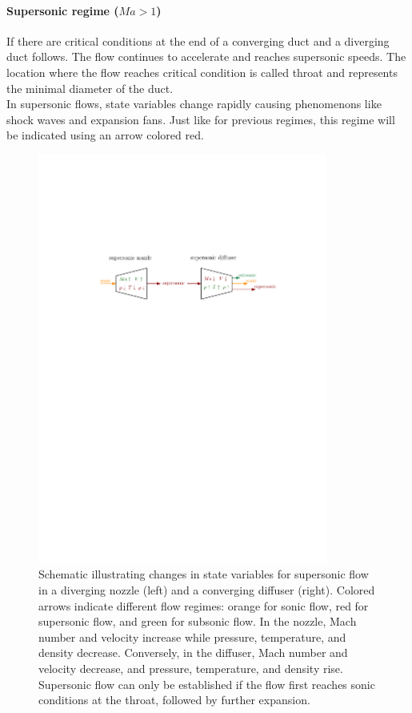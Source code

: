 	\paragraph{Supersonic regime ($Ma > 1$)}
		If there are critical conditions at the end of a converging duct and a diverging duct follows.
		The flow continues to accelerate and reaches supersonic speeds.
		The location where the flow reaches critical condition is called throat and represents the minimal diameter of the duct.\\
		In supersonic flows, state variables change rapidly causing phenomenons like shock waves and expansion fans.
		Just like for previous regimes, this regime will be indicated using an arrow colored red.
		\cite{Cantwell_AA210A}
		\begin{figure}[H]
		    \centering
		    \includegraphics[width=0.85\textwidth]{src/02_foundations/fig_variable-change-supersonic.pdf}
			\caption{
				Schematic illustrating changes in state variables for supersonic flow in a diverging nozzle (left) and a converging diffuser (right).
				Colored arrows indicate different flow regimes: orange for sonic flow, red for supersonic flow, and green for subsonic flow.
				In the nozzle, Mach number and velocity increase while pressure, temperature, and density decrease.
				Conversely, in the diffuser, Mach number and velocity decrease, and pressure, temperature, and density rise.
				Supersonic flow can only be established if the flow first reaches sonic conditions at the throat, followed by further expansion.
				\cite{Cengel2017}
			}
		\end{figure}

